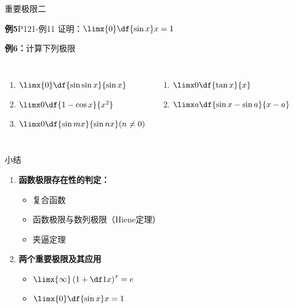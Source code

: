 \begin{frame}{重要极限二}
	\linespread{1.2}
	\begin{alertblock}{{\bf 例5}\hfill P121-例11}
		证明：$\limx{0}\df {\sin x}x=1$
	\end{alertblock}\pause 
	\begin{exampleblock}{{\bf 例6：}计算下列极限\hfill}\pause 
		\begin{columns}[t]
				\begin{enumerate}
				  \item $\limx{0}\df{\sin\sin x}{\sin x}$\pause 
				  \item $\limx 0\df{1-\cos x}{x^2}$\pause 
				  \item $\limx 0\df{\sin mx}{\sin nx}(n\ne 0)$\pause 
				\end{enumerate}
				\begin{enumerate}
				  \addtocounter{enumi}{3}
				  \item $\limx 0\df{\tan x}{x}$\pause 
				  \item $\limx a\df{\sin x-\sin a}{x-a}$
				\end{enumerate}
		\end{columns}
	\end{exampleblock}
\end{frame}

\begin{frame}[<+->]{小结}
	\linespread{1.5}
	\begin{enumerate}
	  \item {\bf 函数极限存在性的判定：}
	  \begin{itemize}
	    \item 复合函数
	    \item 函数极限与数列极限（Hiene定理）
	    \item 夹逼定理
	  \end{itemize}
	  \item {\bf 两个重要极限及其应用}
	  \begin{itemize}
	    \item $\limx{\infty}\left(1+\df 1x\right)^x=e$
	    \item $\limx{0}\df {\sin x}x=1$
	  \end{itemize}
	\end{enumerate}
\end{frame}